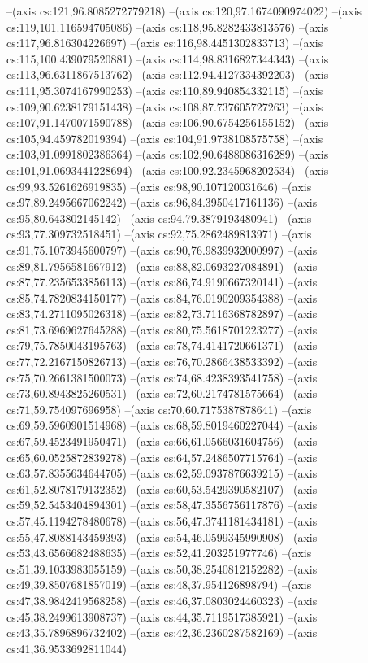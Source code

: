 --(axis cs:121,96.8085272779218)
--(axis cs:120,97.1674090974022)
--(axis cs:119,101.116594705086)
--(axis cs:118,95.8282433813576)
--(axis cs:117,96.816304226697)
--(axis cs:116,98.4451302833713)
--(axis cs:115,100.439079520881)
--(axis cs:114,98.8316827344343)
--(axis cs:113,96.6311867513762)
--(axis cs:112,94.4127334392203)
--(axis cs:111,95.3074167990253)
--(axis cs:110,89.940854332115)
--(axis cs:109,90.6238179151438)
--(axis cs:108,87.737605727263)
--(axis cs:107,91.1470071590788)
--(axis cs:106,90.6754256155152)
--(axis cs:105,94.459782019394)
--(axis cs:104,91.9738108575758)
--(axis cs:103,91.0991802386364)
--(axis cs:102,90.6488086316289)
--(axis cs:101,91.0693441228694)
--(axis cs:100,92.2345968202534)
--(axis cs:99,93.5261626919835)
--(axis cs:98,90.107120031646)
--(axis cs:97,89.2495667062242)
--(axis cs:96,84.3950417161136)
--(axis cs:95,80.643802145142)
--(axis cs:94,79.3879193480941)
--(axis cs:93,77.309732518451)
--(axis cs:92,75.2862489813971)
--(axis cs:91,75.1073945600797)
--(axis cs:90,76.9839932000997)
--(axis cs:89,81.7956581667912)
--(axis cs:88,82.0693227084891)
--(axis cs:87,77.2356533856113)
--(axis cs:86,74.9190667320141)
--(axis cs:85,74.7820834150177)
--(axis cs:84,76.0190209354388)
--(axis cs:83,74.2711095026318)
--(axis cs:82,73.7116368782897)
--(axis cs:81,73.6969627645288)
--(axis cs:80,75.5618701223277)
--(axis cs:79,75.7850043195763)
--(axis cs:78,74.4141720661371)
--(axis cs:77,72.2167150826713)
--(axis cs:76,70.2866438533392)
--(axis cs:75,70.2661381500073)
--(axis cs:74,68.4238393541758)
--(axis cs:73,60.8943825260531)
--(axis cs:72,60.2174781575664)
--(axis cs:71,59.754097696958)
--(axis cs:70,60.7175387878641)
--(axis cs:69,59.5960901514968)
--(axis cs:68,59.8019460227044)
--(axis cs:67,59.4523491950471)
--(axis cs:66,61.0566031604756)
--(axis cs:65,60.0525872839278)
--(axis cs:64,57.2486507715764)
--(axis cs:63,57.8355634644705)
--(axis cs:62,59.0937876639215)
--(axis cs:61,52.8078179132352)
--(axis cs:60,53.5429390582107)
--(axis cs:59,52.5453404894301)
--(axis cs:58,47.3556756117876)
--(axis cs:57,45.1194278480678)
--(axis cs:56,47.3741181434181)
--(axis cs:55,47.8088143459393)
--(axis cs:54,46.0599345990908)
--(axis cs:53,43.6566682488635)
--(axis cs:52,41.203251977746)
--(axis cs:51,39.1033983055159)
--(axis cs:50,38.2540812152282)
--(axis cs:49,39.8507681857019)
--(axis cs:48,37.954126898794)
--(axis cs:47,38.9842419568258)
--(axis cs:46,37.0803024460323)
--(axis cs:45,38.2499613908737)
--(axis cs:44,35.7119517385921)
--(axis cs:43,35.7896896732402)
--(axis cs:42,36.2360287582169)
--(axis cs:41,36.9533692811044)
